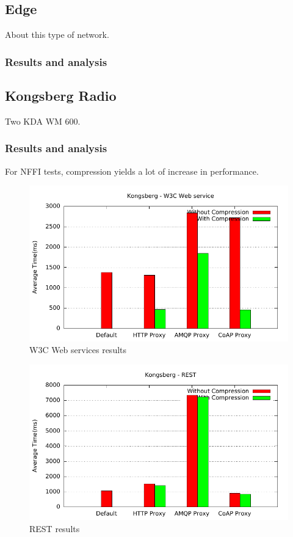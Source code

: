 \subsection{Edge}

About this type of network.


\subsubsection{Results and analysis}

\subsection{Kongsberg Radio}

Two KDA WM 600. 


\subsubsection{Results and analysis}

For NFFI tests, compression yields a lot of increase in performance. 

\begin{figure}[H]
\center
\includegraphics[scale=0.75]{../results/kongsberg/nffi/out.pdf}
\caption{W3C Web services results}
\end{figure}

\begin{figure}[H]
\center
\includegraphics[scale=0.75]{../results/kongsberg/rest/out.pdf}
\caption{REST results}
\end{figure}



